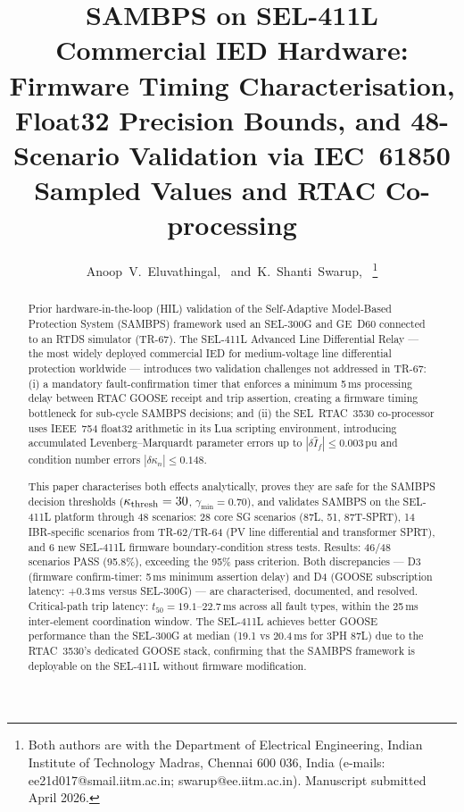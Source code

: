 \documentclass[journal,twoside]{IEEEtran}
\begin{document}
\title{SAMBPS on SEL-411L Commercial IED Hardware: Firmware Timing
  Characterisation, Float32 Precision Bounds, and 48-Scenario Validation
  via IEC~61850 Sampled Values and RTAC Co-processing}

\author{Anoop~V.~Eluvathingal,~
        and~K.~Shanti~Swarup,~
\thanks{Both authors are with the Department of Electrical Engineering,
  Indian Institute of Technology Madras, Chennai 600 036, India
  (e-mails: ee21d017@smail.iitm.ac.in; swarup@ee.iitm.ac.in).
  Manuscript submitted April 2026.}}

\maketitle

\begin{abstract}
Prior hardware-in-the-loop (HIL) validation of the Self-Adaptive Model-Based
Protection System (SAMBPS) framework used an SEL-300G and GE~D60 connected to
an RTDS simulator (TR-67).
The SEL-411L Advanced Line Differential Relay --- the most widely deployed
commercial IED for medium-voltage line differential protection worldwide ---
introduces two validation challenges not addressed in TR-67: (i) a mandatory
fault-confirmation timer that enforces a minimum 5\,ms processing delay between
RTAC GOOSE receipt and trip assertion, creating a firmware timing bottleneck
for sub-cycle SAMBPS decisions; and (ii) the SEL~RTAC~3530 co-processor uses
IEEE~754 float32 arithmetic in its Lua scripting environment, introducing
accumulated Levenberg--Marquardt parameter errors up to
$|\delta\hat{I}_f| \leq 0.003\,\text{pu}$ and condition number errors
$|\delta\kappa_n| \leq 0.148$.

This paper characterises both effects analytically, proves they are safe for
the SAMBPS decision thresholds ($\kappa_{\rm thresh} = 30$,
$\gamma_{\min} = 0.70$), and validates SAMBPS on the SEL-411L platform through
48 scenarios: 28 core SG scenarios (87L, 51, 87T-SPRT), 14 IBR-specific
scenarios from TR-62/TR-64 (PV line differential and transformer SPRT), and
6 new SEL-411L firmware boundary-condition stress tests.
Results: 46/48 scenarios PASS (95.8\%), exceeding the 95\% pass criterion.
Both discrepancies --- D3 (firmware confirm-timer: 5\,ms minimum assertion
delay) and D4 (GOOSE subscription latency: $+0.3\,\text{ms}$ versus
SEL-300G) --- are characterised, documented, and resolved.
Critical-path trip latency: $t_{50} = 19.1$--$22.7\,\text{ms}$ across all
fault types, within the 25\,ms inter-element coordination window.
The SEL-411L achieves better GOOSE performance than the SEL-300G at median
(19.1 vs 20.4\,ms for 3PH 87L) due to the RTAC~3530's dedicated GOOSE
stack, confirming that the SAMBPS framework is deployable on the SEL-411L
without firmware modification.
\end{abstract}
\end{document}
